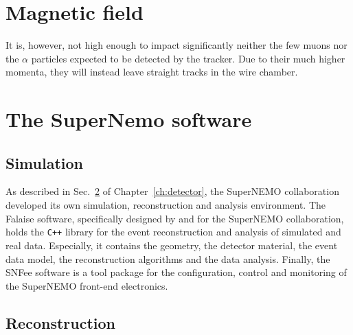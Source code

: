 \section{Magnetic field}
\label{sec:magnetic_field}

It is, however, not high enough to impact significantly neither the few muons nor the $\alpha$ particles expected to be detected by the tracker.
Due to their much higher momenta, they will instead leave straight tracks in the wire chamber.

\section{The SuperNemo software}
\label{sec:SNsoftware}
\subsection{Simulation}

As described in Sec.~\ref{sec:SNsoftware} of Chapter~\ref{ch:detector}, the SuperNEMO collaboration developed its own simulation, reconstruction and analysis environment.
The Falaise software, specifically designed by and for the SuperNEMO collaboration, holds the \verb!C++! library for the event reconstruction and analysis of simulated and real data.
Especially, it contains the geometry, the detector material, the event data model, the reconstruction algorithms and the data analysis.
Finally, the SNFee software is a tool package for the configuration, control and monitoring of the SuperNEMO front-end electronics.

\subsection{Reconstruction}
